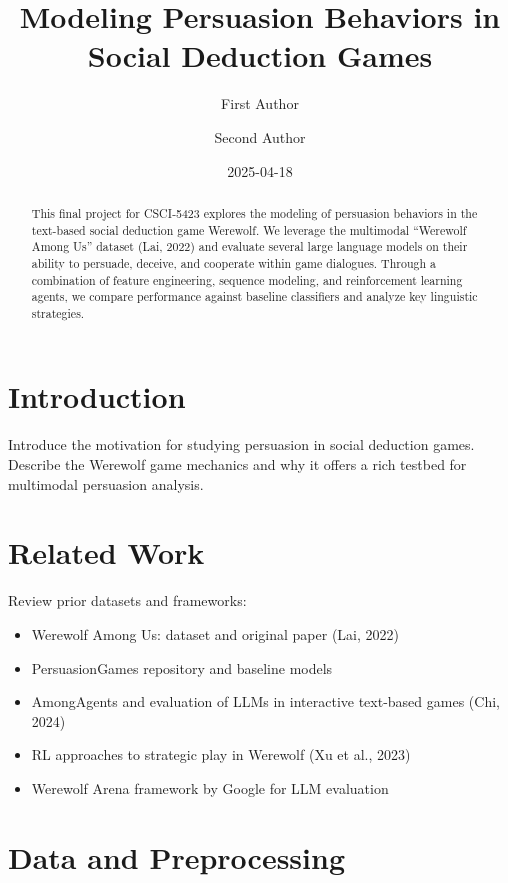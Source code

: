 \documentclass[
  letterpaper,
  DIV=11,
  numbers=noendperiod]{scrreprt}
\title{Modeling Persuasion Behaviors in Social Deduction Games}
\author{First Author \and Second Author}
\date{2025-04-18}
\providecommand{\tightlist}{%
  \setlength{\itemsep}{0pt}\setlength{\parskip}{0pt}}\usepackage{longtable,booktabs,array}
\renewcommand*\contentsname{Table of contents}
\newcommand\contentsname{Table of contents}
\begin{document}
\maketitle
\begin{abstract}
This final project for CSCI‑5423 explores the modeling of persuasion
behaviors in the text-based social deduction game Werewolf. We leverage
the multimodal ``Werewolf Among Us'' dataset (Lai, 2022) and evaluate
several large language models on their ability to persuade, deceive, and
cooperate within game dialogues. Through a combination of feature
engineering, sequence modeling, and reinforcement learning agents, we
compare performance against baseline classifiers and analyze key
linguistic strategies.
\end{abstract}

\renewcommand*\contentsname{Table of contents}
{
\hypersetup{linkcolor=}
\setcounter{tocdepth}{2}
\tableofcontents
}

\chapter{Introduction}\label{introduction}

Introduce the motivation for studying persuasion in social deduction
games. Describe the Werewolf game mechanics and why it offers a rich
testbed for multimodal persuasion analysis.

\chapter{Related Work}\label{related-work}

Review prior datasets and frameworks:

\begin{itemize}
\tightlist
\item
  Werewolf Among Us: dataset and original paper (Lai, 2022)
\item
  PersuasionGames repository and baseline models
\item
  AmongAgents and evaluation of LLMs in interactive text-based games
  (Chi, 2024)
\item
  RL approaches to strategic play in Werewolf (Xu et al., 2023)
\item
  Werewolf Arena framework by Google for LLM evaluation
\end{itemize}

\chapter{Data and Preprocessing}\label{data-and-preprocessing}
\end{document}
